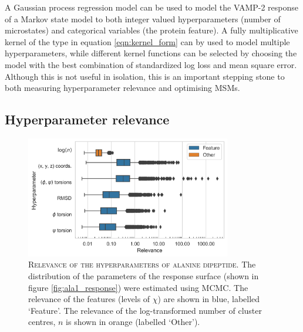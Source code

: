 A Gaussian process regression model can be used to model the VAMP-2 response of a Markov state model to both integer valued hyperparameters (number of microstates) and categorical variables (the protein feature). A fully multiplicative kernel of the type in equation \ref{eqn:kernel_form} can by used to model multiple  hyperparameters, while different kernel functions can be selected by choosing the model with the best combination of standardized log loss and mean square error. Although this is not useful in isolation, this is an important stepping stone to both measuring hyperparameter relevance and optimising MSMs. 

 
\subsection{Hyperparameter relevance}\label{subsubsec:ala_relevance}

\begin{figure}
    \centering
    \includegraphics[width=0.8\textwidth]{chapters/msm_optimization/figures/ala1_relevance.png}
    \caption[Relevance of the hyperparameters of alanine dipeptide]{\textsc{Relevance of the hyperparameters of alanine dipeptide}. The distribution of the parameters of the response surface (shown in figure \ref{fig:ala1_response}) were estimated using MCMC. The relevance of the features (levels of $\chi$) are shown in blue, labelled `Feature'. The relevance of the log-transformed number of cluster centres, $n$ is shown in orange (labelled `Other').}
    \label{fig:ala1_relevance}
\end{figure}


